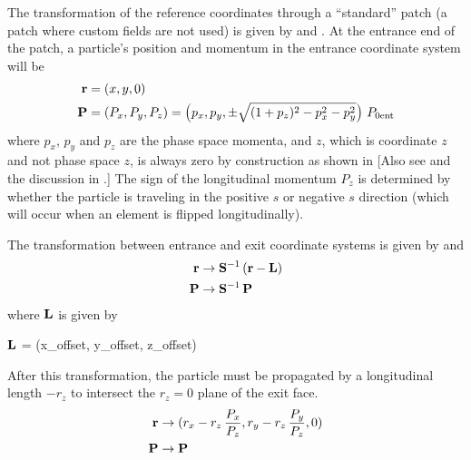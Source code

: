 
The transformation of the reference coordinates through a ``standard''
patch (a patch where custom fields are not used) is given by
 and . At the entrance end of the patch, a
particle's position and momentum in the entrance coordinate system will be
\begin{alignat}{1}
  {\bf r} &= (x, y, 0) \nonumber \\
  {\bf P} &= (P_x, P_y, P_z) = 
    \left( p_x, p_y, \pm \sqrt{(1+p_z)^2 - p_x^2 - p_y^2} \right) \, P_{0\text{ent}}
\end{alignat}
where $p_x$, $p_y$ and $p_z$ are the phase space momenta, and $z$,
which is coordinate $z$ and not phase space $z$, is always zero by
construction as shown in  [Also see 
and the discussion in .] The sign of the
longitudinal momentum $P_z$ is determined by whether the particle is
traveling in the positive $s$ or negative $s$ direction (which will
occur when an element is flipped longitudinally).

The transformation between entrance and exit coordinate systems is given by  and 
\begin{alignat}{1}
  {\bf r} &\rightarrow 
    {\bf S}^{-1} \, ({\bf r} - {\bf L}) \nonumber \\
  {\bf P} &\rightarrow {\bf S}^{-1} \, {\bf P}
\end{alignat}
where $\bf L$ is given by 
\begin{example}
  \(\bf L\) =  (x_offset, y_offset, z_offset)
  \label{lxyz2}
\end{example}

After this transformation, the particle must be propagated by a longitudinal length
$-r_z$ to intersect the $r_z = 0$ plane of the exit face.
\begin{alignat}{1}
  {\bf r} &\rightarrow (r_x - r_z \, \frac{P_x}{P_z}, r_y - r_z \, \frac{P_y}{P_z}, 0) \nonumber \\
  {\bf P} &\rightarrow {\bf P}
\end{alignat}

